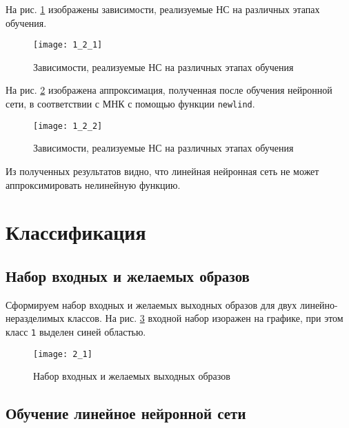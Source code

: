 На рис. \ref{fig:1_2_1} изображены зависимости, реализуемые НС на различных этапах обучения.
\begin{figure}[H]
\begin{center}
	\texttt{[image: 1\_2\_1]}
	\caption{Зависимости, реализуемые НС на различных этапах обучения}
	\label{fig:1_2_1}
\end{center}
\end{figure}

На рис. \ref{fig:1_2_2} изображена аппроксимация, полученная после обучения нейронной сети, в соответствии с МНК с помощью функции \verb+newlind+.
\begin{figure}[H]
\begin{center}
	\texttt{[image: 1\_2\_2]}
	\caption{Зависимости, реализуемые НС на различных этапах обучения}
	\label{fig:1_2_2}
\end{center}
\end{figure}

Из полученных результатов видно, что линейная нейронная сеть не может аппроксимировать нелинейную функцию.

\section{Классификация}


\subsection{Набор входных и желаемых образов}

Сформируем набор входных и желаемых выходных образов для двух линейно-неразделимых классов. На рис. \ref{fig:2_1} входной набор изоражен на графике, при этом класс \verb+1+ выделен синей областью.

\begin{figure}[H]
\begin{center}
	\texttt{[image: 2\_1]}
	\caption{Набор входных и желаемых выходных образов}
	\label{fig:2_1}
\end{center}
\end{figure}

\subsection{Обучение линейное нейронной сети}

